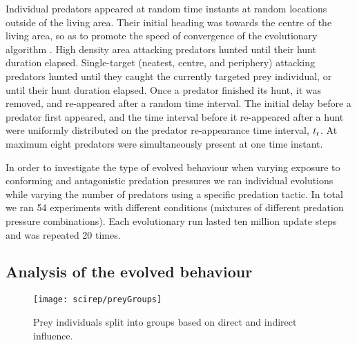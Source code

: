 Individual predators appeared at random time instants at random locations outside of the living area. Their initial heading was towards the centre of the living area, so as to promote the speed of convergence of the evolutionary algorithm \cite{olson2016evolution}. High density area attacking predators hunted until their hunt duration elapsed. Single-target (neatest, centre, and periphery) attacking predators hunted until they caught the currently targeted prey individual, or until their hunt duration elapsed. Once a predator finished its hunt, it was removed, and re-appeared after a random time interval. The initial delay before a predator first appeared, and the time interval before it re-appeared after a hunt were uniformly distributed on the predator re-appearance time interval, $t_\textnormal{r}$. At maximum eight predators were simultaneously present at one time instant.

In order to investigate the type of evolved behaviour when varying exposure to conforming and antagonistic predation pressures we ran individual evolutions while varying the number of predators using a specific predation tactic. In total we ran 54 experiments with different conditions (mixtures of different predation pressure combinations). Each evolutionary run lasted ten million update steps and was repeated 20 times.

\subsection{Analysis of the evolved behaviour}

\begin{figure}
  \texttt{[image: scirep/preyGroups]}
  \caption{Prey individuals split into groups based on direct and indirect influence.}
  \label{figure:groups}
\end{figure}

